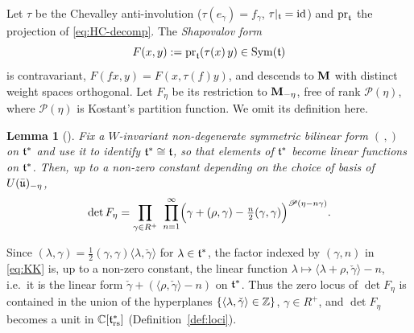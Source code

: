 \documentclass{article}
\theoremstyle{plain}
\newtheorem{lemma}[theorem]{Lemma}
\theoremstyle{definition}
\theoremstyle{remark}
\numberwithin{equation}{section}
\begin{document}
Let $\tau$ be the Chevalley anti-involution ($\tau(e_\gamma)=f_\gamma$, $\tau|_{\mathfrak{t}}=\operatorname{id}$) and $\mathrm{pr}_{\mathfrak{t}}$ the projection of \eqref{eq:HC-decomp}. The \emph{Shapovalov form}
\begin{equation}\label{eq:shapovalov}
F(x,y):=\mathrm{pr}_{\mathfrak{t}}(\tau(x)\,y)\in\operatorname{Sym}(\mathfrak{t})
\end{equation}
is contravariant, $F(fx,y)=F(x,\tau(f)y)$, and descends to $\mathbf{M}$ with distinct weight spaces orthogonal. Let $F_\eta$ be its restriction to $\mathbf{M}_{-\eta}$, free of rank $\mathscr P(\eta)$, where $\mathscr P(\eta)$ is Kostant's partition function. We omit its definition here.

\begin{lemma}[{\cite[Theorem 1]{KAC197997}}]\label{lem:KK}
Fix a $W$-invariant non-degenerate symmetric bilinear form $(\,,)$ on $\mathfrak{t}^*$ and use it to identify $\mathfrak{t}^*\cong\mathfrak{t}$, so that elements of $\mathfrak{t}^*$ become linear functions on $\mathfrak{t}^*$. Then, up to a non-zero constant depending on the choice of basis of $U(\bar{\mathfrak{u}})_{-\eta}$,
\begin{equation}\label{eq:KK}
\det F_\eta=\prod_{\gamma\in R^+}\ \prod_{n=1}^{\infty}\Bigl(\gamma+(\rho,\gamma)-\tfrac{n}{2}(\gamma,\gamma)\Bigr)^{\mathscr P(\eta-n\gamma)} .
\end{equation}
\end{lemma}

Since $(\lambda,\gamma)=\tfrac12(\gamma,\gamma)\langle\lambda,\check\gamma\rangle$ for $\lambda\in\mathfrak{t}^*$, the factor indexed by $(\gamma,n)$ in \eqref{eq:KK} is, up to a non-zero constant, the linear function $\lambda\mapsto\langle\lambda+\rho,\check\gamma\rangle-n$, i.e.\ it is the linear form $\check\gamma+(\langle\rho,\check\gamma\rangle-n)$ on $\mathfrak{t}^*$. Thus the zero locus of $\det F_\eta$ is contained in the union of the hyperplanes $\{\langle\lambda,\check\gamma\rangle\in\mathbb{Z}\}$, $\gamma\in R^+$, and $\det F_\eta$ becomes a unit in $\mathbb{C}[\mathfrak{t}^*_{\mathrm{rs}}]$ (Definition~\ref{def:loci}).
\end{document}
